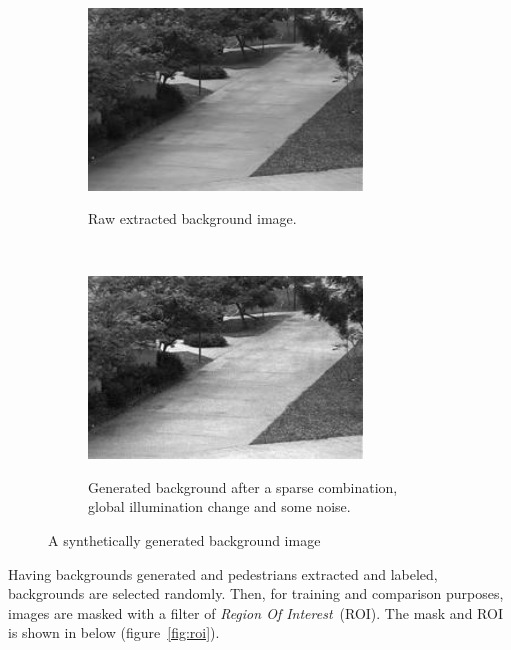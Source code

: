 \begin{enumerate}
 

\begin{figure}[h!]
    \centering
    \begin{subfigure}[t]{0.4\textwidth}
        \centering
        {\includegraphics[width=0.8\textwidth]{images/background}}
        \caption{Raw extracted background image.}
    \end{subfigure}%
    ~ 
    \begin{subfigure}[t]{0.4\textwidth}
        \centering
        {\includegraphics[width=0.8\textwidth]{images/background3}}
        \caption{Generated background after a sparse combination, global illumination change and some noise.}
    \end{subfigure}
    \caption{A synthetically generated background image}
    \label{backback}
\end{figure}

 Having backgrounds generated and pedestrians extracted and labeled, backgrounds are selected randomly. Then, for training and comparison purposes, images are masked with a filter of \textit{Region Of Interest}~(ROI). The mask and ROI is shown in below (figure~\ref{fig:roi}).


\end{enumerate}
